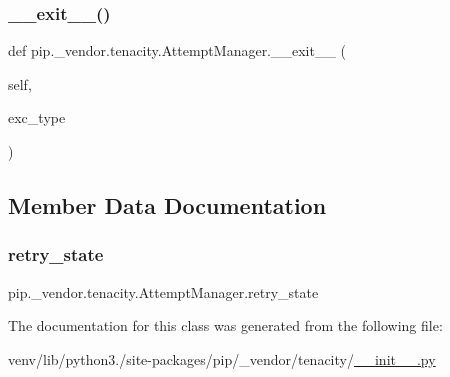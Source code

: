 \subsubsection{\texorpdfstring{\+\_\+\+\_\+exit\+\_\+\+\_\+()}{\_\_exit\_\_()}}
{\footnotesize\ttfamily def pip.\+\_\+vendor.\+tenacity.\+Attempt\+Manager.\+\_\+\+\_\+exit\+\_\+\+\_\+ (\begin{DoxyParamCaption}\item[{}]{self,  }\item[{}]{exc\+\_\+type }\end{DoxyParamCaption})}



\subsection{Member Data Documentation}
\mbox{\label{classpip_1_1__vendor_1_1tenacity_1_1AttemptManager_a6d09c0f551a44ff712d7ac23d17b03d7}} 
\subsubsection{\texorpdfstring{retry\+\_\+state}{retry\_state}}
{\footnotesize\ttfamily pip.\+\_\+vendor.\+tenacity.\+Attempt\+Manager.\+retry\+\_\+state}



The documentation for this class was generated from the following file\+:\begin{DoxyCompactItemize}
\item 
venv/lib/python3./site-\/packages/pip/\+\_\+vendor/tenacity/\hyperlink{venv_2lib_2python3_89_2site-packages_2pip_2__vendor_2tenacity_2____init_____8py}{\+\_\+\+\_\+init\+\_\+\+\_\+.\+py}\end{DoxyCompactItemize}
